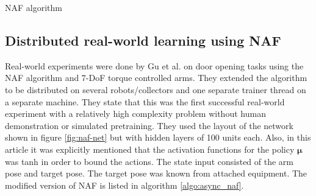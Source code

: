 \begin{algorithm}[!h]
    \caption{NAF algorithm}
    \begin{algorithmic}
                \ENDFOR
            \ENDFOR
        \ENDFOR
    \end{algorithmic}
    \label{algo:naf}
\end{algorithm}

\subsection{Distributed real-world learning using NAF}
\label{sec:distributed_naf}

Real-world experiments were done by Gu et al. \cite{gu2016deep} on door opening
tasks using the NAF algorithm and 7-DoF torque controlled arms. They extended
the algorithm to be distributed on several robots/collectors and one separate
trainer thread on a separate machine. They state that this was the first
successful real-world experiment with a relatively high complexity problem
without human demonstration or simulated pretraining. They used the layout of
the network shown in figure \ref{fig:naf-net} but with hidden layers of 100
units each. Also, in this article it was explicitly mentioned that the
activation functions for the policy $\mathbf{\mu}$ was tanh in order to bound
the actions. The state input consisted of the arm pose and target pose. The
target pose was known from attached equipment. The modified version of NAF is
listed in algorithm \ref{algo:async_naf}.


